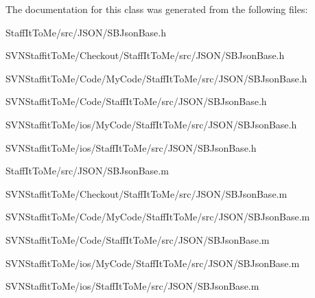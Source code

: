 \-The documentation for this class was generated from the following files\-:\begin{DoxyCompactItemize}
\item 
\-Staff\-It\-To\-Me/src/\-J\-S\-O\-N/\-S\-B\-Json\-Base.\-h\item 
\-S\-V\-N\-Staffit\-To\-Me/\-Checkout/\-Staff\-It\-To\-Me/src/\-J\-S\-O\-N/\-S\-B\-Json\-Base.\-h\item 
\-S\-V\-N\-Staffit\-To\-Me/\-Code/\-My\-Code/\-Staff\-It\-To\-Me/src/\-J\-S\-O\-N/\-S\-B\-Json\-Base.\-h\item 
\-S\-V\-N\-Staffit\-To\-Me/\-Code/\-Staff\-It\-To\-Me/src/\-J\-S\-O\-N/\-S\-B\-Json\-Base.\-h\item 
\-S\-V\-N\-Staffit\-To\-Me/ios/\-My\-Code/\-Staff\-It\-To\-Me/src/\-J\-S\-O\-N/\-S\-B\-Json\-Base.\-h\item 
\-S\-V\-N\-Staffit\-To\-Me/ios/\-Staff\-It\-To\-Me/src/\-J\-S\-O\-N/\-S\-B\-Json\-Base.\-h\item 
\-Staff\-It\-To\-Me/src/\-J\-S\-O\-N/\-S\-B\-Json\-Base.\-m\item 
\-S\-V\-N\-Staffit\-To\-Me/\-Checkout/\-Staff\-It\-To\-Me/src/\-J\-S\-O\-N/\-S\-B\-Json\-Base.\-m\item 
\-S\-V\-N\-Staffit\-To\-Me/\-Code/\-My\-Code/\-Staff\-It\-To\-Me/src/\-J\-S\-O\-N/\-S\-B\-Json\-Base.\-m\item 
\-S\-V\-N\-Staffit\-To\-Me/\-Code/\-Staff\-It\-To\-Me/src/\-J\-S\-O\-N/\-S\-B\-Json\-Base.\-m\item 
\-S\-V\-N\-Staffit\-To\-Me/ios/\-My\-Code/\-Staff\-It\-To\-Me/src/\-J\-S\-O\-N/\-S\-B\-Json\-Base.\-m\item 
\-S\-V\-N\-Staffit\-To\-Me/ios/\-Staff\-It\-To\-Me/src/\-J\-S\-O\-N/\-S\-B\-Json\-Base.\-m\end{DoxyCompactItemize}
